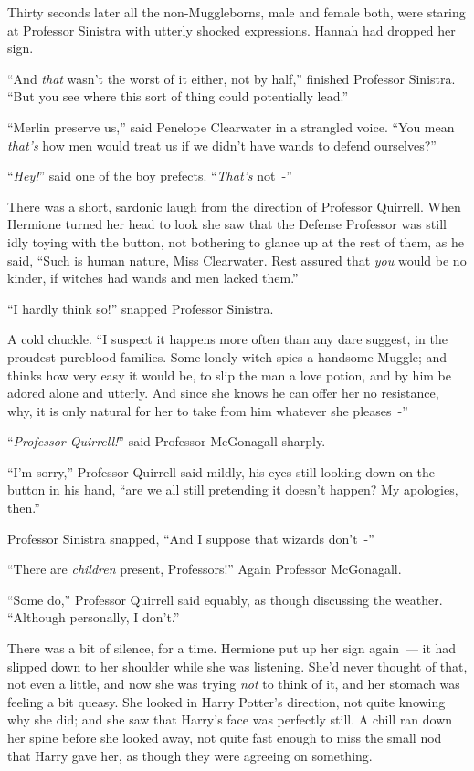 Thirty seconds later all the non-Muggleborns, male and female both, were staring at Professor Sinistra with utterly shocked expressions. Hannah had dropped her sign.

``And \emph{that} wasn't the worst of it either, not by half,'' finished Professor Sinistra. ``But you see where this sort of thing could potentially lead.''

``Merlin preserve us,'' said Penelope Clearwater in a strangled voice. ``You mean \emph{that's} how men would treat us if we didn't have wands to defend ourselves?''

``\emph{Hey!}'' said one of the boy prefects. ``\emph{That's} not~-''

There was a short, sardonic laugh from the direction of Professor Quirrell. When Hermione turned her head to look she saw that the Defense Professor was still idly toying with the button, not bothering to glance up at the rest of them, as he said, ``Such is human nature, Miss Clearwater. Rest assured that \emph{you} would be no kinder, if witches had wands and men lacked them.''

``I hardly think so!'' snapped Professor Sinistra.

A cold chuckle. ``I suspect it happens more often than any dare suggest, in the proudest pureblood families. Some lonely witch spies a handsome Muggle; and thinks how very easy it would be, to slip the man a love potion, and by him be adored alone and utterly. And since she knows he can offer her no resistance, why, it is only natural for her to take from him whatever she pleases~-''

``\emph{Professor Quirrell!}'' said Professor McGonagall sharply.

``I'm sorry,'' Professor Quirrell said mildly, his eyes still looking down on the button in his hand, ``are we all still pretending it doesn't happen? My apologies, then.''

Professor Sinistra snapped, ``And I suppose that wizards don't~-''

``There are \emph{children} present, Professors!'' Again Professor McGonagall.

``Some do,'' Professor Quirrell said equably, as though discussing the weather. ``Although personally, I don't.''

There was a bit of silence, for a time. Hermione put up her sign again~--- it had slipped down to her shoulder while she was listening. She'd never thought of that, not even a little, and now she was trying \emph{not} to think of it, and her stomach was feeling a bit queasy. She looked in Harry Potter's direction, not quite knowing why she did; and she saw that Harry's face was perfectly still. A chill ran down her spine before she looked away, not quite fast enough to miss the small nod that Harry gave her, as though they were agreeing on something.

